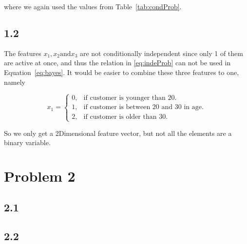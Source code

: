 \documentclass[table,xcdraw]{article}
\begin{document}
where we again used the values from Table~\ref{tab:condProb}.



\subsection*{1.2}

The features $x_1,x_2 \text{and} x_3$ are not conditionally independent since only 1 of them are active at once, and thus the relation in \eqref{eq:indeProb} can not be used in Equation~\eqref{eq:bayes}. It would be easier to combine these three features to one, namely

\[
    x_1= 
\begin{cases}
    0, & \text{if customer is younger than 20.} \\
    1, & \text{if customer is between 20 and 30 in age.}\\
    2, & \text{if customer is older than 30.}
\end{cases}
\]

So we only get a 2Dimensional feature vector, but not all the elements are a binary variable.
 
\newpage 

\section*{Problem 2}
\subsection*{2.1}

\subsection*{2.2}
\end{document}
